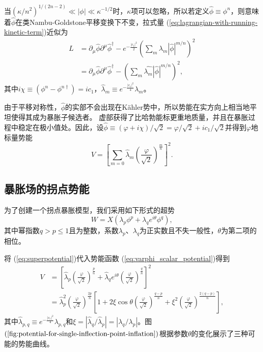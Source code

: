 当${(\kappa/n^2)}^{1/(2n-2)}\ll |\phi| \ll
\kappa^{-1/2}$时，$\kappa$项可以忽略，所以若定义$\hat{\phi} \equiv
\phi^n$，则意味着$\hat{\phi}$在类Nambu-Goldstone平移变换下不变，拉式量
(\ref{eq:lagrangian-with-running-kinetic-term})近似为
\begin{equation}
\begin{split}
    L &= \partial_\mu \hat{\phi}\partial^\mu \hat{\phi}^\dagger -
    e^{-\frac{|c_1|^2}{2}}{(\sum_m \lambda_m|\hat{\phi}|^{m/n})}^2 \\
    &= \partial_\mu \hat{\phi} \partial^\mu \hat{\phi}^\dagger - 
    {(\sum_m \hat{\lambda_m}|\hat{\phi}|^{m/n})}^2,
\end{split}
\end{equation}
其中$i\chi \equiv (\phi^n - \phi^{n\dagger})=i c_1$，$\hat{\lambda}_m\equiv
e^{-\frac{|c_1|^2}{4}}\lambda_m$。

由于平移对称性，$\hat{\phi}$的实部不会出现在K\"ahler势中，所以势能在实方向上相当地平坦使得其成为暴胀子候选者。
虚部获得了比哈勃能标更重地质量，并且在暴胀过程中稳定在极小值处。因此，设$\hat{\phi}\equiv
(\varphi+i \chi)/\sqrt{2}=\varphi/\sqrt{2}+i
c_1/ \sqrt{2}$并得到$\varphi$地标量势能
\begin{equation}\label{eq:varphi_scalar_potential}
    V = {\left[\sum_{m=0}\hat{\lambda}_m
    {\left(\frac{\varphi}{\sqrt{2}}\right)}^{\frac{m}{n}}\right]}^2.
\end{equation}

\subsection{暴胀场的拐点势能}
为了创建一个拐点暴胀模型，我们采用如下形式的超势
\begin{equation}\label{eq:superpotential}
    W = X(\lambda_p\phi^p + \lambda_q e^{i\theta}\phi^q),
\end{equation}
其中幂指数$q > p \le
1$且为整数，系数$\lambda_p$、$\lambda_q$为正实数且不失一般性，$\theta$为第二项的相位。

将 (\ref{eq:superpotential})代入势能函数
(\ref{eq:varphi_scalar_potential})得到
\begin{equation}
  \label{eq:scalar_potential}
\begin{split}
    V &= {\left[ \hat{\lambda}_p {\left(\frac{\varphi}{\sqrt{2}}\right)}^{\frac{p}{n}}
    + \hat{\lambda}_q e^{i\theta}{\left(\frac{\varphi}{\sqrt{2}}\right)}^{\frac{q}{n}}\right]}^2 \\
    &= \hat{\lambda}_p^2 {\left(\frac{\varphi}{\sqrt{2}}\right)}^{\frac{2p}{n}}
    \left[1 + 2\xi\cos\theta {\left(\frac{\varphi}{\sqrt{2}}\right)}^{\frac{q-p}{n}}
    + \xi^2 {\left(\frac{\varphi}{\sqrt{2}}\right)}^{\frac{2(q-p)}{n}}\right],
\end{split}
\end{equation}
其中$\hat{\lambda}_{p,q}\equiv
e^{-\frac{|c_1|^2}{4}}\lambda_{p,q}$和$\xi=|\hat{\lambda}_q/\hat{\lambda}_p|=|\lambda_q/\lambda_p|$。图$(\ref{fig:potential-for-single-inflection-point-inflation})$根据参数$\theta$的变化展示了三种可能的势能曲线。

